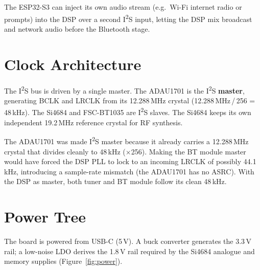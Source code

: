 \documentclass[11pt,a4paper]{report}
\begin{document}
\begin{notebox}
The ESP32-S3 can inject its own audio stream (e.g.\ Wi-Fi internet radio or prompts)
into the DSP over a second I\textsuperscript{2}S input, letting the DSP mix broadcast
and network audio before the Bluetooth stage.
\end{notebox}

\section{Clock Architecture}
The I\textsuperscript{2}S bus is driven by a single master. The ADAU1701 is the
I\textsuperscript{2}S \textbf{master}, generating BCLK and LRCLK from its 12.288\,MHz
crystal (12.288\,MHz\,/\,256 = 48\,kHz). The Si4684 and FSC-BT1035 are
I\textsuperscript{2}S slaves. The Si4684 keeps its own independent 19.2\,MHz reference
crystal for RF synthesis.

\begin{designbox}
The ADAU1701 was made I\textsuperscript{2}S master because it already carries a
12.288\,MHz crystal that divides cleanly to 48\,kHz ($\times$256). Making the BT
module master would have forced the DSP PLL to lock to an incoming LRCLK of possibly
44.1\,kHz, introducing a sample-rate mismatch (the ADAU1701 has no ASRC). With the
DSP as master, both tuner and BT module follow its clean 48\,kHz.
\end{designbox}

\section{Power Tree}
The board is powered from USB-C (5\,V). A buck converter generates the 3.3\,V rail;
a low-noise LDO derives the 1.8\,V rail required by the Si4684 analogue and memory
supplies (Figure~\ref{fig:power}).
\end{document}
